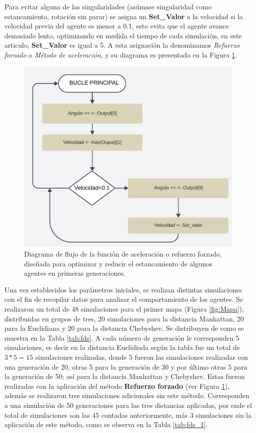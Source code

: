 \documentclass[lettersize, journal]{IEEEtran}
\begin{document}
Para evitar alguna de las singularidades (asúmase singularidad como estancamiento, rotación sin parar) se asigna un \textbf{Set\_Valor} a la velocidad si la velocidad previa del agente es menor a 0.1, esto evita que el agente avance demasiado lento, optimizando en medida el tiempo de cada simulación, en este articulo, \textbf{Set\_Valor} es igual a 5. A esta asignación la denominamos \textit{Refuerzo forzado} o \textit{Método de aceleración}, y su diagrama es presentado en la Figura \ref{fig:reforce}.

\begin{figure}
    \centering
    \includegraphics[width=0.7\linewidth]{images/reforce.png}
    \caption{Diagrama de flujo de la función de aceleración o refuerzo forzado, diseñada para optimizar y reducir el estancamiento de algunos agentes en primeras generaciones.}
    \label{fig:reforce}
\end{figure}

Una vez establecidos los parámetros iniciales, se realizan distintas simulaciones con el fin de recopilar datos para analizar el comportamiento de los agentes. Se realizaron un total de 48 simulaciones para el primer mapa (Figura \ref{fig:Mapa}), distribuidas en grupos de tres, 20 simulaciones para la distancia Manhattan, 20 para la Euclidiana y 20 para la distancia Chebyshev. Se distribuyen de como se muestra en la Tabla \ref{tab:fds}. A cada número de generación le corresponden 5 simulaciones, es decir en la distancia Euclidiada según la tabla fue un total de $3*5 = 15$ simulaciones realizadas, donde 5 fueron las simulaciones realizadas con una generación de 20, otras 5 para la generación de 30 y por último otras 5 para la generación de 50; así para la distancia Manhattan y Chebyshev. Estas fueron realizadas con la aplicación del método \textbf{Refuerzo forzado} (ver Figura \ref{fig:reforce}), además se realizaron tres simulaciones adicionales sin este método. Corresponden a una simulación de 50 generaciones para las tres distancias aplicadas, por ende el total de simulaciones son las 45 contadas anteriormente, más 3 simulaciones sin la aplicación de este método, como se observa en la Tabla \ref{tab:fds_1}.
\end{document}
